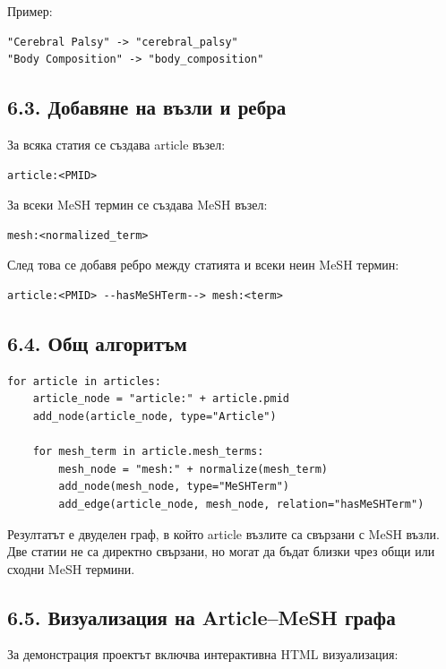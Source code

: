 \documentclass[12pt,a4paper]{article}
\begin{document}
Пример:

\begin{verbatim}
"Cerebral Palsy" -> "cerebral_palsy"
"Body Composition" -> "body_composition"
\end{verbatim}

\subsection{6.3. Добавяне на възли и ребра}

За всяка статия се създава article възел:

\begin{verbatim}
article:<PMID>
\end{verbatim}

За всеки MeSH термин се създава MeSH възел:

\begin{verbatim}
mesh:<normalized_term>
\end{verbatim}

След това се добавя ребро между статията и всеки неин MeSH термин:

\begin{verbatim}
article:<PMID> --hasMeSHTerm--> mesh:<term>
\end{verbatim}

\subsection{6.4. Общ алгоритъм}

\begin{verbatim}
for article in articles:
    article_node = "article:" + article.pmid
    add_node(article_node, type="Article")

    for mesh_term in article.mesh_terms:
        mesh_node = "mesh:" + normalize(mesh_term)
        add_node(mesh_node, type="MeSHTerm")
        add_edge(article_node, mesh_node, relation="hasMeSHTerm")
\end{verbatim}

Резултатът е двуделен граф, в който article възлите са свързани с MeSH възли. Две статии не са директно свързани, но могат да бъдат близки чрез общи или сходни MeSH термини.

\subsection{6.5. Визуализация на Article--MeSH графа}

За демонстрация проектът включва интерактивна HTML визуализация:
\end{document}
